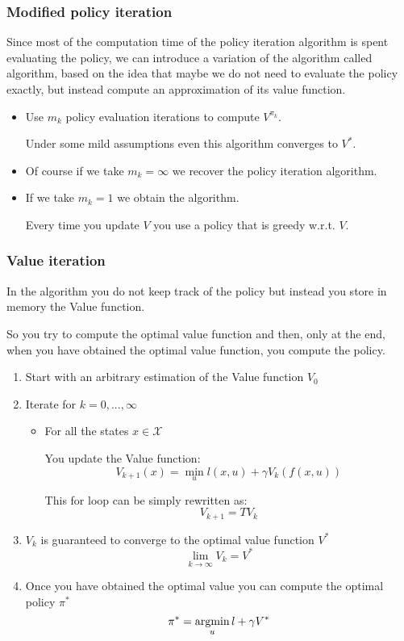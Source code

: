 \subsubsection{Modified policy iteration}
Since most of the computation time of the policy iteration algorithm is spent evaluating the policy, we can introduce a variation of the algorithm called  algorithm, based on the idea that maybe we do not need to evaluate the policy exactly, but instead compute an approximation of its value function.
\begin{itemize}
\item Use $m_k$ policy evaluation iterations to compute $V^{\pi_k}$.

Under some mild assumptions even this algorithm converges to $V^*$.
\item Of course if we take $m_k = \infty$ we recover the policy iteration algorithm.
\item If we take $m_k = 1$ we obtain the  algorithm.

Every time you update $V$ you use a policy that is greedy w.r.t. $V$.
\end{itemize}

\subsubsection{Value iteration}
In the  algorithm you do not keep track of the policy but instead you store in memory the Value function.

So you try to compute the optimal value function and then, only at the end, when you have obtained the optimal value function, you compute the policy.
\begin{enumerate}
\item Start with an arbitrary estimation of the Value function $V_0$
\item Iterate for $k = 0,...,\infty$
\begin{itemize}
\item For all the states $x\in\mathcal{X}$ 

You update the Value function:
\[V_{k+1}(x) = \min_u l(x,u) + \gamma V_k(f(x,u))\]

This for loop can be simply rewritten as:
\[V_{k+1} = TV_k\]
\end{itemize}
\item $V_k$ is guaranteed to converge to the optimal value function $V^*$
\[\lim_{k\to\infty} V_k = V^*\]
\item Once you have obtained the optimal value you can compute the optimal policy $\pi^*$
\[\pi^* = \operatorname*{argmin}_u l + \gamma V^*\]
\end{enumerate}














